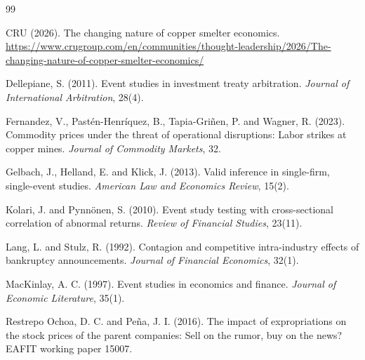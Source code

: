 \documentclass[11pt]{article}
\begin{document}
\begin{thebibliography}{99}
\setlength{\itemsep}{0.2em}
\small

CRU (2026). The changing nature of copper smelter economics. \url{https://www.crugroup.com/en/communities/thought-leadership/2026/The-changing-nature-of-copper-smelter-economics/}

Dellepiane, S. (2011). Event studies in investment treaty arbitration. \emph{Journal of International Arbitration}, 28(4).

Fernandez, V., Pastén-Henríquez, B., Tapia-Griñen, P. and Wagner, R. (2023). Commodity prices under the threat of operational disruptions: Labor strikes at copper mines. \emph{Journal of Commodity Markets}, 32.

Gelbach, J., Helland, E. and Klick, J. (2013). Valid inference in single-firm, single-event studies. \emph{American Law and Economics Review}, 15(2).

Kolari, J. and Pynnönen, S. (2010). Event study testing with cross-sectional correlation of abnormal returns. \emph{Review of Financial Studies}, 23(11).

Lang, L. and Stulz, R. (1992). Contagion and competitive intra-industry effects of bankruptcy announcements. \emph{Journal of Financial Economics}, 32(1).

MacKinlay, A. C. (1997). Event studies in economics and finance. \emph{Journal of Economic Literature}, 35(1).

Restrepo Ochoa, D. C. and Peña, J. I. (2016). The impact of expropriations on the stock prices of the parent companies: Sell on the rumor, buy on the news? EAFIT working paper 15007.

\end{thebibliography}
\end{document}
